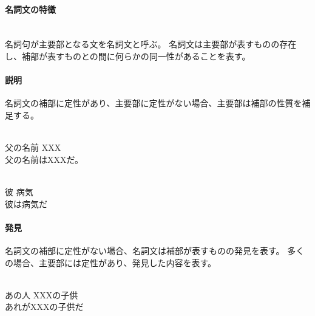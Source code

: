 \paragraph{名詞文の特徴}\quad\\
名詞句が主要部となる文を名詞文と呼ぶ。
名詞文は主要部が表すものの存在し、補部が表すものとの間に何らかの同一性があることを表す。

\paragraph{説明}
名詞文の補部に定性があり、主要部に定性がない場合、主要部は補部の性質を補足する。

\begin{exe}
    \ex \gll [u\'ak\'a ap\'a piku\'o] [XXX] \\
        父の名前 XXX \\
    \glt 父の名前はXXXだ。
\end{exe}
\begin{exe}
    \ex \gll [k\'ap\'a] [k\'um\'ame] \\
        彼 病気 \\
    \glt 彼は病気だ
\end{exe}

\paragraph{発見}
名詞文の補部に定性がない場合、名詞文は補部が表すものの発見を表す。
多くの場合、主要部には定性があり、発見した内容を表す。

\begin{exe}
    \ex {} \\
        あの人 XXXの子供 \\
    \glt あれがXXXの子供だ
\end{exe}